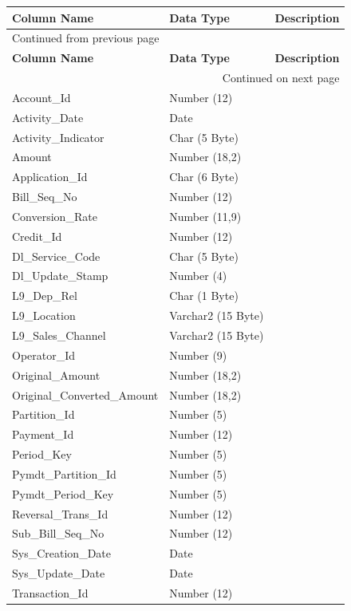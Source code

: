 \documentclass[12pt,twoside]{article}
\begin{document}
\begin{longtable}{l|l|l}
\hline
\textbf{Column Name} & \textbf{Data Type} & \textbf{Description}\\
\hline
\endfirsthead
\multicolumn{3}{l}{Continued from previous page} \\
\hline

\textbf{Column Name} & \textbf{Data Type} & \textbf{Description} \\

\hline
\endhead
\hline\multicolumn{3}{r}{Continued on next page} \\
\endfoot
\endlastfoot
\hline
Account\_Id & Number (12) & \\
Activity\_Date & Date & \\
Activity\_Indicator & Char (5 Byte) & \\
Amount & Number (18,2) & \\
Application\_Id & Char (6 Byte) & \\
Bill\_Seq\_No & Number (12) & \\
Conversion\_Rate & Number (11,9) & \\
Credit\_Id & Number (12) & \\
Dl\_Service\_Code & Char (5 Byte) & \\
Dl\_Update\_Stamp & Number (4) & \\
L9\_Dep\_Rel & Char (1 Byte) & \\
L9\_Location & Varchar2 (15 Byte) & \\
L9\_Sales\_Channel & Varchar2 (15 Byte) & \\
Operator\_Id & Number (9) & \\
Original\_Amount & Number (18,2) & \\
Original\_Converted\_Amount & Number (18,2) & \\
Partition\_Id & Number (5) & \\
Payment\_Id & Number (12) & \\
Period\_Key & Number (5) & \\
Pymdt\_Partition\_Id & Number (5) & \\
Pymdt\_Period\_Key & Number (5) & \\
Reversal\_Trans\_Id & Number (12) & \\
Sub\_Bill\_Seq\_No & Number (12) & \\
Sys\_Creation\_Date & Date & \\
Sys\_Update\_Date & Date & \\
Transaction\_Id & Number (12) & \\
\hline
\end{longtable}
\normalsize
\end{document}
